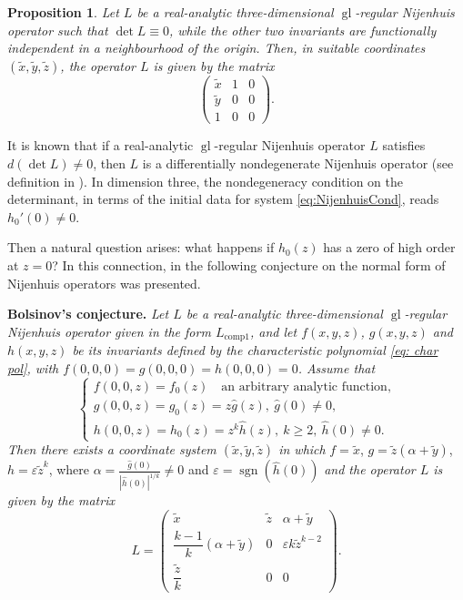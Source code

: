 \documentclass[10pt,a4paper]{amsart}
\newtheorem{Proposition}{Proposition}
\begin{document}
\begin{Proposition}
    Let $L$ be a real-analytic three-dimensional $\operatorname{gl}$-regular Nijenhuis operator such that $\det L \equiv 0$, while the other two invariants are functionally independent in a neighbourhood of the origin.
    Then, in suitable coordinates $(\tilde{x}, \tilde{y}, \tilde{z})$, the operator $L$ is given by the matrix
    \[
    \begin{pmatrix}
        \tilde{x} & 1 & 0 \\
        \tilde{y} & 0 & 0 \\
        1 & 0 & 0
    \end{pmatrix}.
    \]
\end{Proposition}

It is known that if a real-analytic $\operatorname{gl}$-regular Nijenhuis operator $L$ satisfies $d(\det L) \neq 0$, then $L$ is a differentially nondegenerate Nijenhuis operator (see definition in \cite{bolsinov2022nijenhuisNGI}). In dimension three, the nondegeneracy condition on the determinant, in terms of the initial data for system \eqref{eq:NijenhuisCond}, reads $h_0'(0)\neq 0$.

Then a natural question arises: what happens if $h_0(z)$ has a zero of high order at $z=0$? In this connection, in \cite{bkm} the following conjecture on the normal form of Nijenhuis operators was presented.

\textbf{Bolsinov's conjecture.}
\textit{Let $L$ be a real-analytic three-dimensional $\operatorname{gl}$-regular Nijenhuis operator given in the form $L_{\operatorname{comp1}}$, and let $f(x,y,z)$, $g(x,y,z)$ and $h(x,y,z)$ be its invariants defined by the characteristic polynomial \eqref{eq: char pol}, with $f(0,0,0) = g(0,0,0) = h(0,0,0) = 0$. 
    Assume that }
    $$
    \begin{cases}
      f(0,0,z) = f_0(z) \quad \text{an arbitrary analytic function,} \\
      g(0,0,z) = g_0(z) = z \hat{g}(z), \ \hat{g}(0) \neq 0, \\
      h(0,0,z) = h_0(z) = z^k \hat{h}(z), \ k \geq 2, \ \hat{h}(0) \neq 0. 
    \end{cases}
    $$
  \textit{Then there exists a coordinate system $(\tilde{x},\tilde{y},\tilde{z})$ in which } $ f = \tilde{x}$, $g = \tilde{z}(\alpha + \tilde{y})$, $ h = \varepsilon \tilde{z}^k$, where $\alpha = \frac{\hat{g}(0)}{|\hat{h}(0)|^{1/k}} \neq 0$ and $\varepsilon = \operatorname{sgn}(\hat{h}(0))$ \textit{and the operator $L$ is given by the matrix}
    \begin{equation}
        L = \begin{pmatrix}
            \tilde{x} & \tilde{z} & \alpha +\tilde{y} \\[2pt]
            \dfrac{k-1}{k}(\alpha +\tilde{y}) & 0 & \varepsilon k\tilde{z}^{k-2} \\[6pt]
            \dfrac{\tilde{z}}{k} & 0 & 0
        \end{pmatrix}.
    \end{equation}
\end{document}
